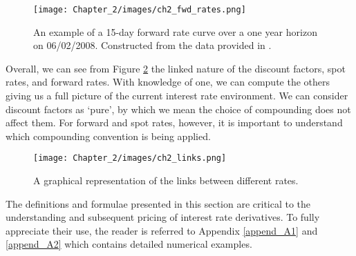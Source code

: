 \vspace{0.75cm}

\begin{figure}[ht]
\begin{center}
\texttt{[image: Chapter\_2/images/ch2\_fwd\_rates.png]}
\caption[15-day Forward Curve on 06/02/2008]{An example of a 15-day forward rate curve over a one year horizon on 06/02/2008. Constructed from the data provided in \cite{flavell2012swaps}.}
\label{fig:fwd_curve}
\end{center}
\end{figure}

\newpage

Overall, we can see from Figure \ref{fig:linked_rates} the linked nature of the discount factors, spot rates, and forward rates. With knowledge of one, we can compute the others giving us a full picture of the current interest rate environment. We can consider discount factors as `pure', by which we mean the choice of compounding does not affect them. For forward and spot rates, however, it is important to understand which compounding convention is being applied.

\begin{figure}[ht]
\begin{center}
\texttt{[image: Chapter\_2/images/ch2\_links.png]}
\caption[Links between forward rates, spot rates, and discount factors]{A graphical representation of the links between different rates.}
\label{fig:linked_rates}
\end{center}
\end{figure}

The definitions and formulae presented in this section are critical to the understanding and subsequent pricing of interest rate derivatives. To fully appreciate their use, the reader is referred to Appendix \ref{append_A1} and \ref{append_A2} which contains detailed numerical examples. 